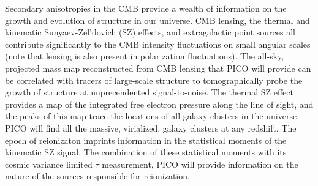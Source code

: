 \documentclass[PICOReport.tex]{subfiles}
\begin{document}





  Secondary anisotropies in the CMB provide
a wealth of information on the growth and evolution of structure in our universe.
CMB lensing, the thermal and kinematic Sunyaev-Zel'dovich (SZ)
effects, and extragalactic point sources all contribute significantly
to the CMB intensity fluctuations on small angular scales (note that
lensing is also present in polarization fluctuations). The all-sky,
projected mass map reconstructed from CMB lensing that PICO will
provide can be correlated with tracers of large-scale structure to
tomographically probe the growth of structure at unprecendented
signal-to-noise. The thermal SZ effect provides a map of the
integrated free electron pressure along the line of sight, and the
peaks of this map trace the locations of all galaxy clusters in the
universe. PICO will find all the massive, virialized, galaxy clusters
at any redshift.  The epoch of reionizaton imprints information in the
statistical moments of the kinematic SZ signal.  The combination of
these statistical moments with its cosmic variance limited $\tau$
measurement, PICO will provide information on the nature of the
sources responsible for reionization.
\end{document}
